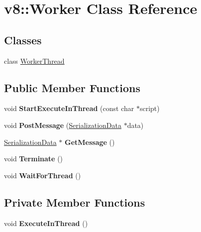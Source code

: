 \hypertarget{classv8_1_1_worker}{}\section{v8\+:\+:Worker Class Reference}
\label{classv8_1_1_worker}
\subsection*{Classes}
\begin{DoxyCompactItemize}
\item 
class \hyperlink{classv8_1_1_worker_1_1_worker_thread}{Worker\+Thread}
\end{DoxyCompactItemize}
\subsection*{Public Member Functions}
\begin{DoxyCompactItemize}
\item 
void {\bfseries Start\+Execute\+In\+Thread} (const char $\ast$script)\hypertarget{classv8_1_1_worker_a148fd74ff315fb120e2bff451141a6b7}{}\label{classv8_1_1_worker_a148fd74ff315fb120e2bff451141a6b7}

\item 
void {\bfseries Post\+Message} (\hyperlink{classv8_1_1_serialization_data}{Serialization\+Data} $\ast$data)\hypertarget{classv8_1_1_worker_a8f4cd76a869ed2aa34fb78a02564c38b}{}\label{classv8_1_1_worker_a8f4cd76a869ed2aa34fb78a02564c38b}

\item 
\hyperlink{classv8_1_1_serialization_data}{Serialization\+Data} $\ast$ {\bfseries Get\+Message} ()\hypertarget{classv8_1_1_worker_aaae8255c55514c012677ea0785ade63a}{}\label{classv8_1_1_worker_aaae8255c55514c012677ea0785ade63a}

\item 
void {\bfseries Terminate} ()\hypertarget{classv8_1_1_worker_a9252812cf431f134826c80898de978e6}{}\label{classv8_1_1_worker_a9252812cf431f134826c80898de978e6}

\item 
void {\bfseries Wait\+For\+Thread} ()\hypertarget{classv8_1_1_worker_a858ecfde01402d3337943224e6ac2a20}{}\label{classv8_1_1_worker_a858ecfde01402d3337943224e6ac2a20}

\end{DoxyCompactItemize}
\subsection*{Private Member Functions}
\begin{DoxyCompactItemize}
\item 
void {\bfseries Execute\+In\+Thread} ()\hypertarget{classv8_1_1_worker_a366fa9c43d9d6ff2051d38a6dd41cb9e}{}\label{classv8_1_1_worker_a366fa9c43d9d6ff2051d38a6dd41cb9e}

\end{DoxyCompactItemize}
